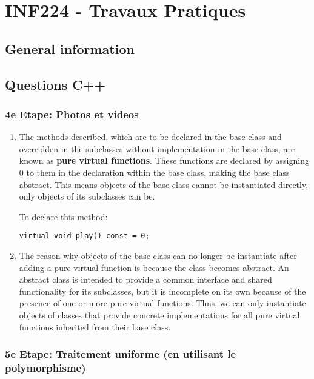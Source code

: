 \documentclass[
]{article}
\author{}
\date{}
\begin{document}
\section{INF224 - Travaux Pratiques}\label{inf224---travaux-pratiques}

\subsection{General information}\label{general-information}

\subsection{Questions C++}\label{questions-c}

\subsubsection{4e Etape: Photos et
videos}\label{e-etape-photos-et-videos}

\begin{enumerate}
\def\labelenumi{\arabic{enumi}.}
\item
  The methods described, which are to be declared in the base class and
  overridden in the subclasses without implementation in the base class,
  are known as \textbf{pure virtual functions}. These functions are
  declared by assigning 0 to them in the declaration within the base
  class, making the base class abstract. This means objects of the base
  class cannot be instantiated directly, only objects of its subclasses
  can be.

  To declare this method:

  \texttt{virtual\ void\ play()\ const\ =\ 0;}
\item
  The reason why objects of the base class can no longer be instantiate
  after adding a pure virtual function is because the class becomes
  abstract. An abstract class is intended to provide a common interface
  and shared functionality for its subclasses, but it is incomplete on
  its own because of the presence of one or more pure virtual functions.
  Thus, we can only instantiate objects of classes that provide concrete
  implementations for all pure virtual functions inherited from their
  base class.
\end{enumerate}

\subsubsection{5e Etape: Traitement uniforme (en utilisant le
polymorphisme)}\label{e-etape-traitement-uniforme-en-utilisant-le-polymorphisme}
\end{document}
